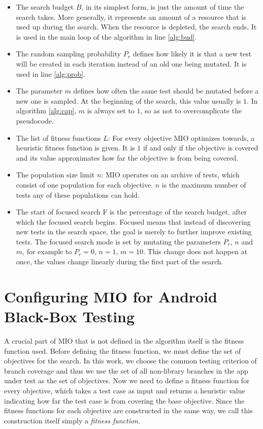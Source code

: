 \documentclass[
  a4paper,  %
  twoside,  %
  bibliography=totoc,
  headsepline,
  cleardoublepage=empty,
  parskip=half,
  draft=false
]{scrbook}
\begin{document}
\begin{itemize}
	\item The search budget $B$, in its simplest form, is just the amount of time the search takes. More generally, it represents an amount of a resource that is used up during the search. When the resource is depleted, the search ends. It is used in the main loop of the algorithm in line \ref{alg:bud}.
	\item The random sampling probability $P_r$ defines how likely it is that a new test will be created in each iteration instead of an old one being mutated. It is used in line \ref{alg:prob}.
	\item The parameter $m$ defines how often the same test should be mutated before a new one is sampled. At the beginning of the search, this value usually is $1$. In algorithm \ref{alg:cap}, $m$ is always set to $1$, so as not to overcomplicate the pseudocode.
	\item The list of fitness functions $L$: For every objective MIO optimizes towards, a heuristic fitness function is given. It is $1$ if and only if the objective is covered and its value approximates how far the objective is from being covered.
	\item The population size limit $n$: MIO operates on an archive of tests, which consist of one population for each objective. $n$ is the maximum number of tests any of these populations can hold.
	\item The start of focused search F is the percentage of the search budget, after which the focused search begins. Focused means that instead of discovering new tests in the search space, the goal is merely to further improve existing tests. The focused search mode is set by mutating the parameters $P_r$, $n$ and $m$, for example to $P_r = 0$, $n = 1$, $m = 10$. This change does not happen at once, the values change linearly during the first part of the search.
\end{itemize}

\section{Configuring MIO for Android Black-Box Testing}

A crucial part of MIO that is not defined in the algorithm itself is the fitness function used.
Before defining the fitness function, we must define the set of objectives for the search.
In this work, we choose the common testing criterion of branch coverage and thus we use the set of all non-library branches in the app under test as the set of objectives.
Now we need to define a fitness function for every objective, which takes a test case as input and returns a heuristic value indicating how far the test case is from covering the base objective.
Since the fitness functions for each objective are constructed in the same way, we call this construction itself simply a \emph{fitness function}.
\end{document}
